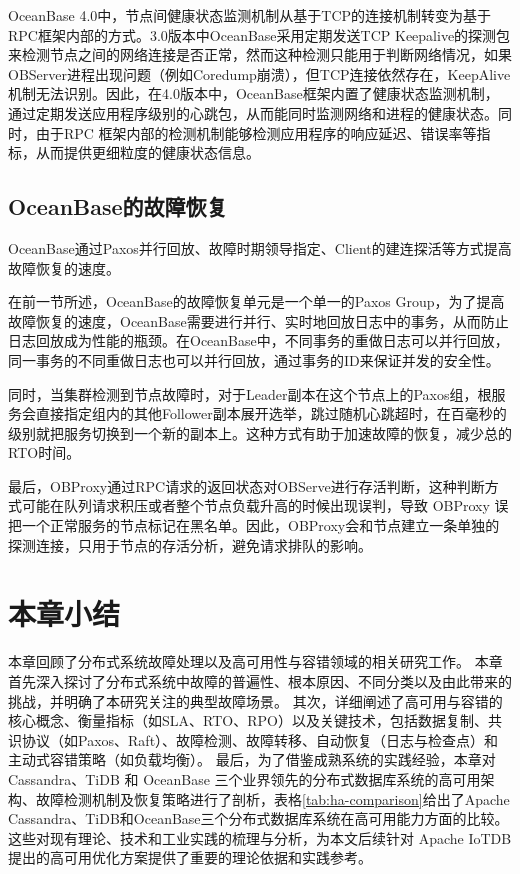 OceanBase 4.0中，节点间健康状态监测机制从基于TCP的连接机制转变为基于RPC框架内部的方式。3.0版本中OceanBase采用定期发送TCP Keepalive的探测包来检测节点之间的网络连接是否正常，然而这种检测只能用于判断网络情况，如果OBServer进程出现问题（例如Coredump崩溃），但TCP连接依然存在，KeepAlive机制无法识别。因此，在4.0版本中，OceanBase框架内置了健康状态监测机制，通过定期发送应用程序级别的心跳包，从而能同时监测网络和进程的健康状态。同时，由于RPC 框架内部的检测机制能够检测应用程序的响应延迟、错误率等指标，从而提供更细粒度的健康状态信息。

\subsection{OceanBase的故障恢复}

OceanBase通过Paxos并行回放、故障时期领导指定、Client的建连探活等方式提高故障恢复的速度。

在前一节所述，OceanBase的故障恢复单元是一个单一的Paxos Group，为了提高故障恢复的速度，OceanBase需要进行并行、实时地回放日志中的事务，从而防止日志回放成为性能的瓶颈。在OceanBase中，不同事务的重做日志可以并行回放，同一事务的不同重做日志也可以并行回放，通过事务的ID来保证并发的安全性。

同时，当集群检测到节点故障时，对于Leader副本在这个节点上的Paxos组，根服务会直接指定组内的其他Follower副本展开选举，跳过随机心跳超时，在百毫秒的级别就把服务切换到一个新的副本上。这种方式有助于加速故障的恢复，减少总的RTO时间。

最后，OBProxy通过RPC请求的返回状态对OBServe进行存活判断，这种判断方式可能在队列请求积压或者整个节点负载升高的时候出现误判，导致 OBProxy 误把一个正常服务的节点标记在黑名单。因此，OBProxy会和节点建立一条单独的探测连接，只用于节点的存活分析，避免请求排队的影响。

\section{本章小结}

本章回顾了分布式系统故障处理以及高可用性与容错领域的相关研究工作。
本章首先深入探讨了分布式系统中故障的普遍性、根本原因、不同分类以及由此带来的挑战，并明确了本研究关注的典型故障场景。
其次，详细阐述了高可用与容错的核心概念、衡量指标（如SLA、RTO、RPO）以及关键技术，包括数据复制、共识协议（如Paxos、Raft）、故障检测、故障转移、自动恢复（日志与检查点）和主动式容错策略（如负载均衡）。
最后，为了借鉴成熟系统的实践经验，本章对 Cassandra、TiDB 和 OceanBase 三个业界领先的分布式数据库系统的高可用架构、故障检测机制及恢复策略进行了剖析，表格\ref{tab:ha-comparison}给出了Apache Cassandra、TiDB和OceanBase三个分布式数据库系统在高可用能力方面的比较。这些对现有理论、技术和工业实践的梳理与分析，为本文后续针对 Apache IoTDB 提出的高可用优化方案提供了重要的理论依据和实践参考。


